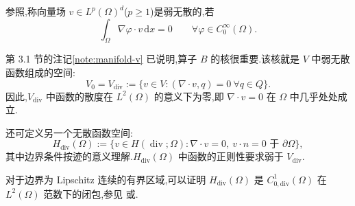\begin{definition}[无散向量场]\label{def:weakly-divergence-free}
参照,称向量场 $v\in L^p(\Omega)^d$($p\ge1$)是弱无散的,若
\[
  \int_\Omega \nabla\varphi\cdot v\,\mathrm{d}x=0
  \qquad\forall\varphi\in C_0^\infty(\Omega).
\]
\end{definition}

\begin{note}[弱无散函数空间]\label{note:weakly-divergence-free-spaces}
第 3.1 节的注记\ref{note:manifold-v} 已说明,算子 $B$ 的核很重要.该核就是 $V$ 中弱无散函数组成的空间:
\begin{equation}\label{eq:vdiv-space}
  V_0=V_{\mathrm{div}}
    :=\{v\in V:(\nabla\cdot v,q)=0\ \forall q\in Q\}.
\end{equation}
因此,$V_{\mathrm{div}}$ 中函数的散度在 $L^2(\Omega)$ 的意义下为零,即 $\nabla\cdot v=0$ 在 $\Omega$ 中几乎处处成立.

还可定义另一个无散函数空间:
\begin{equation}\label{eq:hdiv-divergence-free-space}
  H_{\mathrm{div}}(\Omega)
  :=\{v\in H(\operatorname{div};\Omega):
       \nabla\cdot v=0,\ v\cdot n=0\text{ 于 }\partial\Omega\},
\end{equation}
其中边界条件按迹的意义理解.$H_{\mathrm{div}}(\Omega)$ 中函数的正则性要求弱于 $V_{\mathrm{div}}$.

对于边界为 Lipschitz 连续的有界区域,可以证明 $H_{\mathrm{div}}(\Omega)$ 是 $C_{0,\mathrm{div}}^1(\Omega)$ 在 $L^2(\Omega)$ 范数下的闭包,参见\textcite[命题 1.8]{ConstantinFoias1988} 或\textcite[第 II 章,引理 2.5.3]{Sohr2001}.
\end{note}

